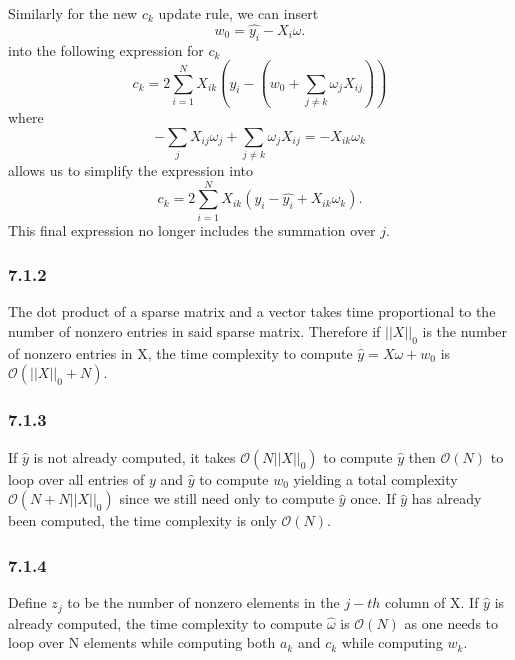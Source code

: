 \documentclass[12pt]{amsart}
\begin{document}
Similarly for the new $c_k$ update rule, we can insert
\begin{equation}
w_0 = \hat{y_i} - X_i \omega.
\end{equation}
into the following expression for $c_k$
\begin{equation}
c_k = 2 \sum_{i=1}^N X_{ik}(y_i - (w_0 + \sum_{j \neq k}\omega_j X_{ij}))
\end{equation}
where 
\begin{equation}
-\sum_j X_{ij}\omega_j + \sum_{j \neq k}\omega_j X_{ij} = -X_{ik}\omega_k
\end{equation}
allows us to simplify the expression into 
\begin{equation}
c_k = 2 \sum_{i=1}^N X_{ik}(y_i - \hat{y_i} + X_{ik}\omega_k).
\end{equation}
This final expression no longer includes the summation over $j$.

\subsubsection*{7.1.2}
The dot product of a sparse matrix and a vector takes time proportional to the number of nonzero entries in said sparse matrix.  Therefore if $||X||_0$ is the number of nonzero entries in X, the time complexity to compute $\hat{y} = X\omega + w_0$ is $\mathcal{O}(||X||_0 + N)$.

\subsubsection*{7.1.3}

If $\hat{y}$ is not already computed, it takes $\mathcal{O}(N ||X||_0)$ to compute $\hat{y}$ then $\mathcal{O}(N)$ to loop over all entries of $y$ and $\hat{y}$ to compute $w_0$ yielding a total complexity $\mathcal{O}(N + N||X||_0)$ since we still need only to compute $\hat{y}$ once.  If $\hat{y}$ has already been computed, the time complexity is only $\mathcal{O}(N)$. 

\subsubsection*{7.1.4}

Define $z_j$ to be the number of nonzero elements in the $j-th$ column of X.  If $\hat{y}$ is already computed, the time complexity to compute $\hat{\omega}$ is $\mathcal{O}(N)$ as one needs to loop over N elements while computing both $a_k$ and $c_k$ while computing $w_k$.
\end{document}
